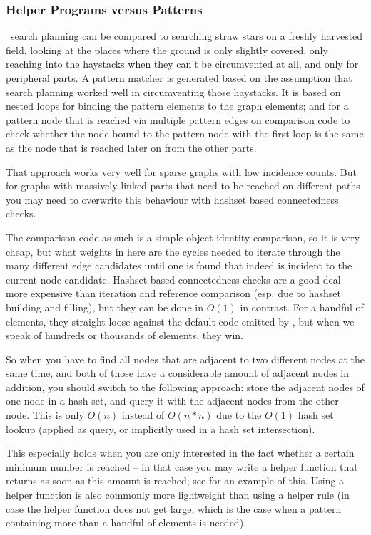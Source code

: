 \subsubsection*{Helper Programs versus Patterns}
\GrG\ search planning can be compared to searching straw stars on a freshly harvested field,
looking at the places where the ground is only slightly covered, 
only reaching into the haystacks when they can't be circumvented at all, and only for peripheral parts.
A pattern matcher is generated based on the assumption that search planning worked well in circumventing those haystacks. 
It is based on nested loops for binding the pattern elements to the graph elements;
and for a pattern node that is reached via multiple pattern edges
on comparison code to check
whether the node bound to the pattern node with the first loop
is the same as the node that is reached later on from the other parts. 


That approach works very well for sparse graphs with low incidence counts.
But for graphs with massively linked parts that need to be reached on different paths you may need to overwrite this behaviour with hashset based connectedness checks.

The comparison code as such is a simple object identity comparison, so it is very cheap, 
but what weights in here are the cycles needed to iterate through the many different edge candidates until one is found that indeed is incident to the current node candidate.
Hashset based connectedness checks are a good deal more expensive than iteration and reference comparison (esp. due to hashset building and filling), but they can be done in $O(1)$ in contrast.
For a handful of elements, they straight loose against the default code emitted by \GrG, but when we speak of hundreds or thousands of elements, they win.

So when you have to find all nodes that are adjacent to two different nodes at the same time, 
and both of those have a considerable amount of adjacent nodes in addition,
you should switch to the following approach:
store the adjacent nodes of one node in a hash set, and query it with the adjacent nodes from the other node.
This is only $O(n)$ instead of $O(n*n)$ due to the $O(1)$ hash set lookup (applied as query, or implicitly used in a hash set intersection).

This especially holds when you are only interested in the fact whether a certain minimum number is reached -- in that case you may write a helper function that returns as soon as this amount is reached; see \cite{MovieDatabase} for an example of this.
Using a helper function is also commonly more lightweight than using a helper rule (in case the helper function does not get large, which is the case when a pattern containing more than a handful of elements is needed).

